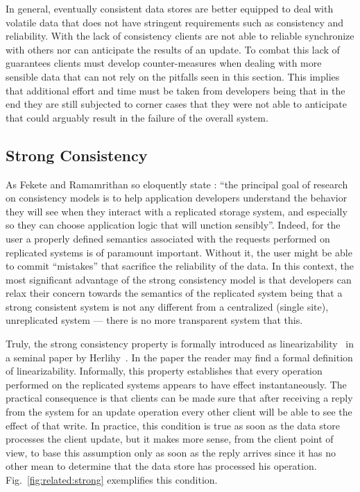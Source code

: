 In general, eventually consistent data stores are better equipped to deal with volatile data that does not have stringent requirements such as consistency and reliability.
With the lack of consistency clients are not able to reliable  synchronize with others nor can anticipate the results of an update. 
To combat this lack of guarantees clients must develop counter-measures when dealing with more sensible data that can not rely on the pitfalls seen in this section. 
This implies that additional effort and time must be taken from developers being that in the end they are still subjected to corner cases that they were not able to anticipate  that could arguably result in the failure of the overall system. 


\subsection{Strong Consistency}
As Fekete and Ramamrithan so eloquently state : ``the principal goal of research on consistency models is to help application developers understand the behavior they will see when they interact with a replicated storage system, and especially so they can choose application logic that will unction sensibly''. \cite{fekete2010consistency}
Indeed, for the user a properly defined semantics associated with the requests performed on replicated systems is of paramount important. 
Without it, the user might be able to commit ``mistakes'' that sacrifice the reliability of the data. 
In this context, the most significant advantage of the strong consistency model  is that developers can relax their concern towards the semantics of the replicated system being that a strong consistent system is not any different from a centralized (single site), unreplicated system --- there is no more transparent system that this. 

Truly, the strong consistency property is formally introduced as linearizability~\cite{herlihy1990linearizability} in a seminal paper by Herlihy~\etal. 
In the paper the reader may find a formal definition of linearizability. 
Informally, this property establishes that every operation performed on the replicated systems appears to have effect instantaneously. 
The practical consequence is that clients can be made sure that after receiving a reply from the system for an update operation every other client will be able to see the effect of that write. In practice, this condition is true as soon as the data store processes the client update, but it makes more sense, from the client point of view, to base this assumption only as soon as the reply arrives since it has no other mean to determine that the data store has processed his operation. Fig.~\ref{fig:related:strong} exemplifies this condition. 

